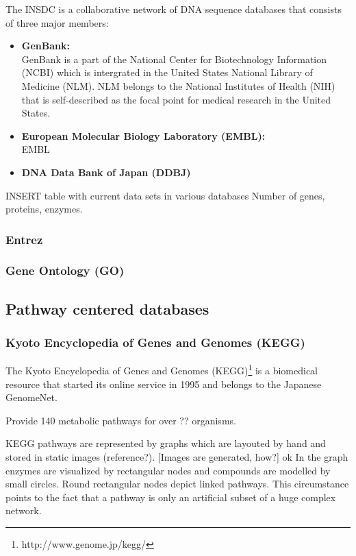 The INSDC is a collaborative network of DNA sequence databases that consists of three major members:
\begin{itemize}
 \item \textbf{GenBank:} \\
 GenBank is a part of the National Center for Biotechnology Information (NCBI) which is intergrated in the United States National Library of Medicine (NLM). NLM belongs to the National Institutes of Health (NIH) that is self-described as the focal point for medical research in the United States.
 \item \textbf{European Molecular Biology Laboratory (EMBL):} \\
 EMBL
 \item \textbf{DNA Data Bank of Japan (DDBJ)} \\
\end{itemize}

INSERT table with current data sets in various databases
Number of genes, proteins, enzymes.

\subsubsection{Entrez}

\subsubsection{Gene Ontology (GO)}

\subsection{Pathway centered databases}

\subsubsection{Kyoto Encyclopedia of Genes and Genomes (KEGG)}

The Kyoto Encyclopedia of Genes and Genomes (KEGG)\footnote{http://www.genome.jp/kegg/} is a biomedical resource that started its online service in 1995 and belongs to the Japanese GenomeNet.

Provide 140 metabolic pathways for over ?? organisms.

KEGG pathways are represented by graphs which are layouted by hand and stored in static images (reference?). [Images are generated, how?]
ok
In the graph enzymes are visualized by rectangular nodes and compounds are modelled by small circles. Round rectangular nodes depict linked pathways. This circumstance points to the fact that a pathway is only an artificial subset of a huge complex network. 

